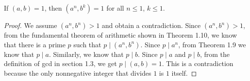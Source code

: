 \begin{exercise}{1.3}
  If \( (a, b) = 1 \), then \( (a^n, b^k) = 1 \) for all \( n \le 1
  \), \( k \le 1 \).
\end{exercise}

\begin{proof}
  We assume \( (a^n, b^n) > 1 \) and obtain a contradiction. Since \(
  (a^n, b^n) > 1 \), from the fundamental theorem of arithmetic shown
  in Theorem 1.10, we know that there is a prime \( p \) such that \(
  p \mid (a^n, b^n) \). Since \( p \mid a^n \), from Theorem 1.9 we
  know that \( p \mid a \). Similarly, we know that \( p \mid b \).
  Since \( p \mid a \) and \( p \mid b \), from the definition of gcd
  in section 1.3, we get \( p \mid (a, b) = 1 \). This is a
  contradiction because the only nonnegative integer that divides \( 1
  \) is \( 1 \) itself.
\end{proof}

